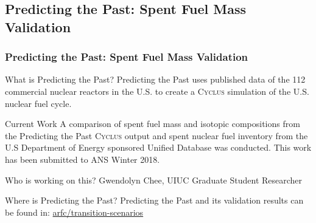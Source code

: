 \newcommand{\Cyclus}{\textsc{Cyclus}\xspace}%
\subsection{Predicting the Past: Spent Fuel Mass Validation}
\begin{frame}
  \frametitle{Predicting the Past: Spent Fuel Mass Validation}

\begin{block}{What is Predicting the Past? }
Predicting the Past uses published data of the 112 commercial nuclear reactors in the U.S. to create a \Cyclus simulation of the U.S. nuclear fuel cycle.
\end{block}

\begin{block}{Current Work}
A comparison of spent fuel mass and isotopic compositions from the Predicting the Past \Cyclus output and spent nuclear fuel inventory from the U.S Department of Energy sponsored Unified Database\cite{peterson_unf-st&dards_2017} was conducted. This work has been submitted to ANS Winter 2018.
\end{block}

\begin{block}{Who is working on this?}
Gwendolyn Chee, UIUC Graduate Student Researcher
\end{block}

\begin{block}{Where is Predicting the Past?}
Predicting the Past and its validation results can be found in: \href{https://github.com/arfc/transition-scenarios/tree/master/input/predicting-the-past}{arfc/transition-scenarios} 
\end{block}

\end{frame}
